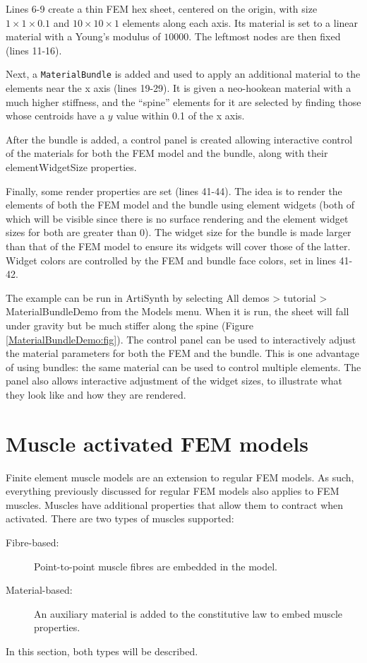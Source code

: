 Lines 6-9 create a thin FEM hex sheet, centered on the origin, with
size $1 \times 1 \times 0.1$ and $10 \times 10 \times 1$ elements
along each axis. Its material is set to a linear material with a
Young's modulus of $10000$. The leftmost nodes are then fixed (lines
11-16).

Next, a {\tt MaterialBundle} is added and used to apply an additional
material to the elements near the x axis (lines 19-29). It is given a
neo-hookean material with a much higher stiffness, and the ``spine''
elements for it are selected by finding those whose centroids 
have a $y$ value within 0.1 of the x axis.

After the bundle is added, a control panel is created allowing
interactive control of the materials for both the FEM model and the
bundle, along with their {\sf elementWidgetSize} properties.

Finally, some render properties are set (lines 41-44). The idea is to
render the elements of both the FEM model and the bundle using element
widgets (both of which will be visible since there is no surface
rendering and the element widget sizes for both are greater than 0).
The widget size for the bundle is made larger than that of the FEM
model to ensure its widgets will cover those of the latter. Widget
colors are controlled by the FEM and bundle face colors, set in lines
41-42.

The example can be run in ArtiSynth by selecting {\sf All demos >
tutorial > MaterialBundleDemo} from the {\sf Models} menu.  When it is
run, the sheet will fall under gravity but be much stiffer along the
spine (Figure \ref{MaterialBundleDemo:fig}). The control panel can be
used to interactively adjust the material parameters for both the FEM
and the bundle. This is one advantage of using bundles: the same
material can be used to control multiple elements. The panel also
allows interactive adjustment of the widget sizes, to illustrate what
they look like and how they are rendered.

\section{Muscle activated FEM models}
\label{sec:fem:muscle}

Finite element muscle models are an extension to regular FEM models.  As such,
everything previously discussed for regular FEM models also applies to FEM
muscles.  Muscles have additional properties that allow them to contract when 
activated.  There are two types of muscles supported:
\begin{description}
\item[Fibre-based:] Point-to-point muscle fibres are embedded in the model.
\item[Material-based:] An auxiliary material is added to the constitutive law
    to embed muscle properties. 
\end{description}
In this section, both types will be described.

